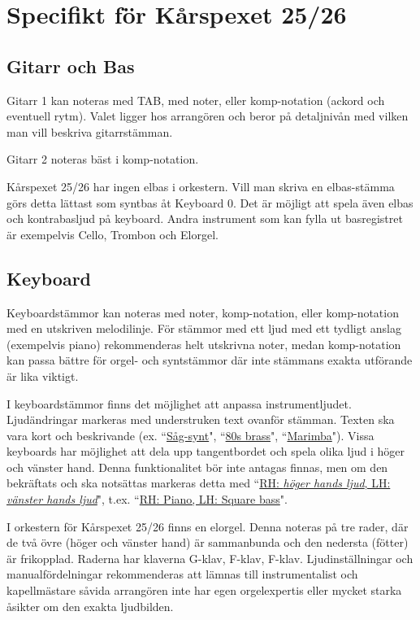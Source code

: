 \chapter{Specifikt för Kårspexet 25/26}
\section{Gitarr och Bas}
Gitarr 1 kan noteras med TAB, med noter, eller komp-notation (ackord och eventuell rytm). Valet ligger hos arrangören och beror på detaljnivån med vilken man vill beskriva gitarrstämman. 

Gitarr 2 noteras bäst i komp-notation.

Kårspexet 25/26 har ingen elbas i orkestern. Vill man skriva en elbas-stämma görs detta lättast som syntbas åt Keyboard 0. Det är möjligt att spela även elbas och kontrabasljud på keyboard. Andra instrument som kan fylla ut basregistret är exempelvis Cello, Trombon och Elorgel. 

\section{Keyboard}
Keyboardstämmor kan noteras med noter, komp-notation, eller komp-notation med en utskriven melodilinje. För stämmor med ett ljud med ett tydligt anslag (exempelvis piano) rekommenderas helt utskrivna noter, medan komp-notation kan passa bättre för orgel- och syntstämmor där inte stämmans exakta utförande är lika viktigt.


I keyboardstämmor finns det möjlighet att anpassa instrumentljudet. Ljudändringar markeras med understruken text ovanför stämman. Texten ska vara kort och beskrivande (ex. ``\underline{Såg-synt}", ``\underline{80s brass}", ``\underline{Marimba}"). Vissa keyboards har möjlighet att dela upp tangentbordet och spela olika ljud i höger och vänster hand. Denna funktionalitet bör inte antagas finnas, men om den bekräftats och ska notsättas markeras detta med ``\underline{RH: \textit{höger hands ljud}, LH: \textit{vänster hands ljud}}", t.ex. ``\underline{RH: Piano, LH: Square bass}".

\vspace{1em}
I orkestern för Kårspexet 25/26 finns en elorgel. Denna noteras på tre rader, där de två övre (höger och vänster hand) är sammanbunda och den nedersta (fötter) är frikopplad. Raderna har klaverna G-klav, F-klav, F-klav. Ljudinställningar och manualfördelningar rekommenderas att lämnas till instrumentalist och kapellmästare såvida arrangören inte har egen orgelexpertis eller mycket starka åsikter om den exakta ljudbilden. 

